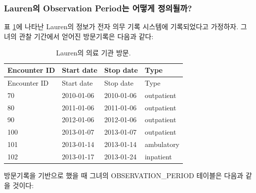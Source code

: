 \documentclass[10.5pt]{book}
\theoremstyle{definition}
\theoremstyle{definition}
\theoremstyle{definition}
\theoremstyle{remark}
\begin{document}
\subsubsection*{Lauren의 Observation Period는 어떻게
정의될까?}\label{lauren-observation-period--}

표 \ref{tab:encounters}에 나타난 Lauren의 정보가 전자 의무 기록 시스템에
기록되었다고 가정하자. 그녀의 관찰 기간에서 얻어진 방문기록은 다음과
같다:

\begin{longtable}[]{@{}llll@{}}
\caption{\label{tab:encounters} Lauren의 의료 기관 방문.}\tabularnewline
\toprule
Encounter ID & Start date & Stop date & Type\tabularnewline
\midrule
\endfirsthead
\toprule
Encounter ID & Start date & Stop date & Type\tabularnewline
\midrule
\endhead
70 & 2010-01-06 & 2010-01-06 & outpatient\tabularnewline
80 & 2011-01-06 & 2011-01-06 & outpatient\tabularnewline
90 & 2012-01-06 & 2012-01-06 & outpatient\tabularnewline
100 & 2013-01-07 & 2013-01-07 & outpatient\tabularnewline
101 & 2013-01-14 & 2013-01-14 & ambulatory\tabularnewline
102 & 2013-01-17 & 2013-01-24 & inpatient\tabularnewline
\bottomrule
\end{longtable}

방문기록을 기반으로 했을 때 그녀의 OBSERVATION\_PERIOD 테이블은 다음과
같을 것이다:
\end{document}
